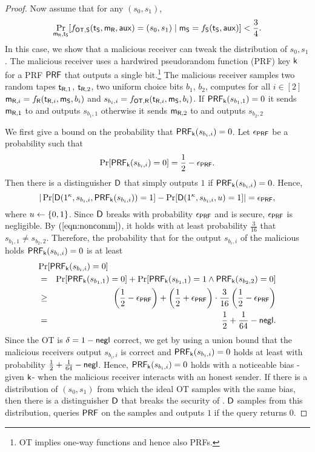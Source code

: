 \begin{proof}
Now assume that for any $(s_0,s_1)$,
\begin{eqnarray}\label{eqn:noncomm}
\Pr_{\mathsf{m}_{\mathsf{R}}, \mathsf{t}_{\mathsf{S}}}[f_{\mathsf{OT},\mathsf{S}}(\mathsf{t}_{\mathsf{S}},\mathsf{m}_{\mathsf{R}},\mathsf{aux})=(s_0,s_1)\mid \mathsf{m}_{\mathsf{S}}=f_{\mathsf{S}}(\mathsf{t}_{\mathsf{S}},\mathsf{aux})]<\frac{3}{4}.
\end{eqnarray}
In this case, we show that a malicious receiver can tweak the distribution of $s_0,s_1$.
The malicious receiver uses a hardwired pseudorandom function (PRF) key $\mathsf{k}$ for a PRF $\mathsf{PRF}$ that outputs a single bit.\footnote{OT implies one-way functions and hence also PRFs.} The malicious receiver samples two random tapes $\mathsf{t}_{\mathsf{R},1}$, $\mathsf{t}_{\mathsf{R},2}$, two uniform choice bits $b_1$, $b_2$, computes for all $i\in[2]$ $\mathsf{m}_{\mathsf{R},i}=f_{\mathsf{R}}(\mathsf{t}_{\mathsf{R},i},\mathsf{m}_{\mathsf{S}},b_i)$ and $s_{b_i,i}=f_{\mathsf{OT},\mathsf{R}}(\mathsf{t}_{\mathsf{R},i},\mathsf{m}_{\mathsf{S}},b_i)$. If $\mathsf{PRF}_{\mathsf{k}}(s_{b_1,1})=0$ it sends $\mathsf{m}_{\mathsf{R},1}$ to \send and outputs $s_{b_1,1}$ otherwise it sends $\mathsf{m}_{\mathsf{R}, 2}$ to \send and outputs $s_{b_2,2}$

 We first give a bound on the probability that $\mathsf{PRF}_{\mathsf{k}}(s_{b_i,i})=0$. Let $\epsilon_{\mathsf{PRF}}$ be a probability such that
$$
\Pr[\mathsf{PRF}_{\mathsf{k}}(s_{b_i,i})=0]= \frac{1}{2}-\epsilon_{\mathsf{PRF}}.
$$
Then there is a distinguisher $\mathsf D$ that simply outputs $1$ if $\mathsf{PRF}_{\mathsf{k}}(s_{b_i,i})=0$. Hence,
$$
|\Pr[\mathsf D(1^\kappa,s_{b_i,i},\mathsf{PRF}_{\mathsf{k}}(s_{b_i,i}))=1]-\Pr[\mathsf D(1^\kappa,s_{b_i,i},u)=1]|=\epsilon_{\mathsf{PRF}},
$$  
where $u\leftarrow\{0,1\}$. Since $\mathsf D$ breaks \PRF with probability $\epsilon_{\mathsf{PRF}}$ and \PRF is secure, $\epsilon_{\mathsf{PRF}}$ is negligible. By $(\ref{eqn:noncomm})$, it holds with at least probability $\frac{3}{16}$ that $s_{b_1,1}\neq s_{b_2,2}$. Therefore, the probability that for the output $s_{b_i,i}$ of the malicious holds $\mathsf{PRF}_{\mathsf{k}}(s_{b_i,i})=0$ is at least
\begin{eqnarray*}
\lefteqn{\Pr[\PRF_{\key}(s_{b_i,i})=0]}\\
&=&\Pr[\PRF_{\key}(s_{b_1,1})=0]+\Pr[\PRF_{\key}(s_{b_1,1})=1\wedge\PRF_{\key}(s_{b_2,2})=0]\\
&\geq&  \left(\frac{1}{2}-\epsilon_{\PRF}\right)+\left(\frac{1}{2}+\epsilon_{\PRF}\right)\cdot\frac{3}{16}\left(\frac{1}{2}-\epsilon_{\PRF}\right)\\
&=& \frac{1}{2}+\frac{1}{64}-\negl.
\end{eqnarray*}
Since the OT is $\delta=1-\mathsf{negl}$ correct, we get by using a union bound that the malicious receivers output $s_{b_i,i}$ is correct and $\mathsf{PRF}_{\mathsf{k}}(s_{b_i,i})=0$ holds at least with probability $\frac{1}{2}+\frac{1}{64}-\mathsf{negl}$. Hence, $\mathsf{PRF}_{\mathsf{k}}(s_{b_i,i})=0$ holds with a noticeable bias - given $\mathsf{k}$- when the malicious receiver interacts with an honest sender. If there is a distribution of $(s_0,s_1)$ from which the ideal OT samples with the same bias, then there is a distinguisher $\mathsf D$ that breaks the security of \PRF. $\mathsf D$ samples from this distribution, queries $\mathsf{PRF}$ on the samples and outputs $1$ if the query returns $0$. 


\end{proof}
